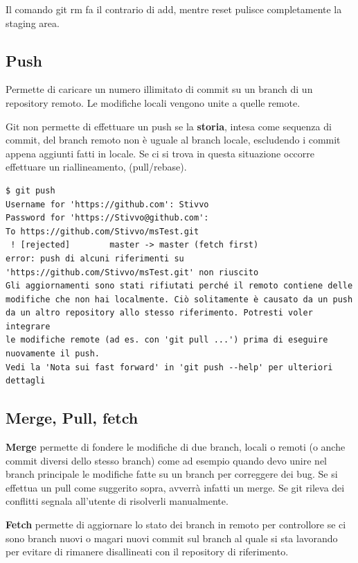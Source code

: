 \documentclass{article} \usepackage[textwidth=18cm,textheight=18cm]{geometry}
\begin{document}
Il comando git rm fa il contrario di add, mentre reset pulisce completamente la
staging area.

\subsection{Push}

Permette di caricare un numero illimitato di commit su un branch di un
repository remoto. Le modifiche locali vengono unite a quelle remote.

Git non permette di effettuare un push se la \textbf{storia}, intesa come sequenza di commit,
del branch remoto non è uguale al branch locale, escludendo i commit
appena aggiunti fatti in locale. Se ci si trova in questa situazione occorre effettuare un riallineamento,
(pull/rebase).

\begin{verbatim}
$ git push
Username for 'https://github.com': Stivvo
Password for 'https://Stivvo@github.com':
To https://github.com/Stivvo/msTest.git
 ! [rejected]        master -> master (fetch first)
error: push di alcuni riferimenti su 'https://github.com/Stivvo/msTest.git' non riuscito
Gli aggiornamenti sono stati rifiutati perché il remoto contiene delle
modifiche che non hai localmente. Ciò solitamente è causato da un push
da un altro repository allo stesso riferimento. Potresti voler integrare
le modifiche remote (ad es. con 'git pull ...') prima di eseguire
nuovamente il push.
Vedi la 'Nota sui fast forward' in 'git push --help' per ulteriori
dettagli
\end{verbatim}

\subsection{Merge, Pull, fetch}

\textbf{Merge} permette di fondere le modifiche di due branch, locali o remoti (o anche
commit diversi dello stesso branch) come ad esempio quando devo unire nel branch principale
le modifiche fatte su un branch per correggere dei bug. Se si effettua un pull come suggerito
sopra, avverrà infatti un merge. Se git rileva dei conflitti segnala all'utente
di risolverli manualmente. 

\textbf{Fetch} permette di aggiornare lo stato dei branch in remoto per controllore
se ci sono branch nuovi o magari nuovi commit sul branch al quale si sta lavorando per evitare
di rimanere disallineati con il repository di riferimento.
\end{document}
